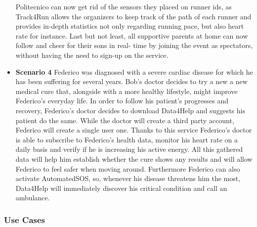 \documentclass[titlepage]{article}
\begin{document}
\begin{itemize}
					Politecnico can now get rid of the sensors they placed on runner ids, as Track4Run allows the 						organizers to keep track of the path of each runner and provides in-depth statistics not only 						regarding running pace, but also heart rate for instance. 
					Last but not least, all supportive parents at home can now follow and cheer for their sons in real-					time by joining the event as spectators, without having the need to sign-up on the service.
					\item {\bf Scenario 4} \linebreak
					Federico was diagnosed with a severe cardiac disease for which he has been suffering for several 					years. Bob’s doctor decides to try a new a new medical cure that, alongside with a more healthy 					lifestyle, might improve Federico’s everyday life. In order to follow his patient’s progresses and 						recovery, Federico’s doctor decides to download Data4Help and suggests his patient do the same. 					While the doctor will create a third party account, Federico will create a single user one. Thanks to 					this service Federico’s doctor is able to subscribe to Federico’s health data, monitor his heart rate 					on a daily basis and verify if he is increasing his active energy. All this gathered data will help him 					establish whether the cure shows any results and will allow Federico to feel safer when moving 					around. Furthermore Federico can also activate AutomatedSOS, so, whenever his disease 						threatens him the most, Data4Help will immediately discover his critical condition and call an 						ambulance.
				\end{itemize}	
			
		\subsubsection{Use Cases}
		
		
\end{document}
